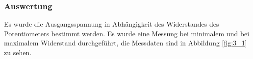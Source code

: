 \documentclass[12pt,a4paper]{article}
\begin{document}
\subsubsection{Auswertung}

Es wurde die Ausgangsspannung in Abhängigkeit des Widerstandes des Potentiometers bestimmt werden. Es wurde eine Messung bei minimalem und bei maximalem Widerstand durchgeführt, die Messdaten sind in Abbildung \ref{fig:3_1} zu sehen.
\end{document}
